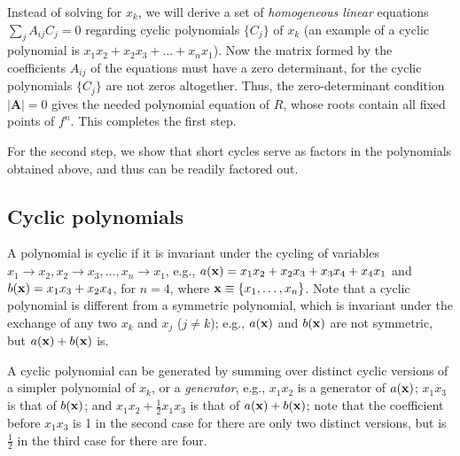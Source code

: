 \documentclass{ws-ijbc}
\begin{document}
Instead of solving  for $x_k$,
  we will derive a set of \emph{homogeneous linear} equations
  $\sum_j A_{ij} C_j = 0$
  regarding cyclic polynomials $\{C_j\}$ of $x_k$
  (an example of a cyclic polynomial is $x_1 x_2 + x_2 x_3 + \dots + x_n x_1$).
%
Now the matrix formed by the coefficients $A_{ij}$ of the equations
  must have a zero determinant,
  for the cyclic polynomials $\{C_j\}$ are not zeros altogether.
%
Thus, the zero-determinant condition $|\mathbf A| = 0$ gives
  the needed polynomial equation of $R$,
whose roots contain all fixed points of $f^n$.
This completes the first step.
%
%


For the second step,
we show
that short cycles serve as
factors in the polynomials obtained above,
and thus can be readily factored out.


\subsection{\label{sec:cyclic}Cyclic polynomials}


A polynomial is cyclic if it is invariant
  under the cycling of variables
  $x_1 \rightarrow x_2, x_2 \rightarrow x_3,
  \ldots, x_n \rightarrow x_1$,
  e.g., $a(\mathbf{x}) = x_1 x_2 + x_2 x_3 + x_3 x_4 + x_4 x_1$
  and $b(\mathbf{x}) = x_1 x_3 + x_2 x_4$,
  for $n = 4$, where $\mathbf{x} \equiv \{x_1, \ldots, x_n\}$.
Note that a cyclic polynomial is different from a symmetric polynomial,
  which is invariant under the exchange of any two $x_k$ and $x_{j}$ ($j \ne k$);
  e.g., $a(\mathbf{x})$ and $b(\mathbf{x})$ are not symmetric,
  but $a(\mathbf{x}) + b(\mathbf{x})$ is.


A cyclic polynomial can be generated by summing over
  distinct cyclic versions of a simpler polynomial of $x_k$, or a \emph{generator},
e.g.,
$x_1 x_2$ is a generator of $a(\mathbf{x})$;
$x_1 x_3$ is that of $b(\mathbf{x})$;
and
$x_1 x_2 + \frac{1}{2} x_1 x_3$ is that of $a(\mathbf{x}) + b(\mathbf{x})$;
note that the coefficient before $x_1 x_3$
  is 1 in the second case
  for there are only two distinct versions,
  but is $\frac{1}{2}$ in the third case
  for there are four. %
\end{document}
